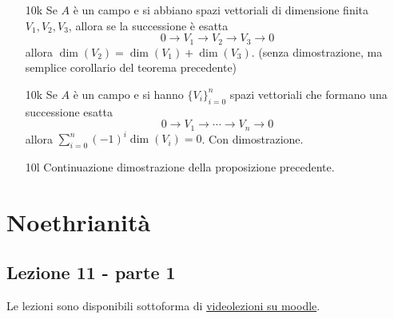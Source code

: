 \documentclass[italian]{article}
\begin{document}
\begin{enumerate}
      \item[10k] Se $A$ è un campo e si abbiano spazi vettoriali di dimensione
        finita $V_1, V_2, V_3$, allora se la successione è esatta 
        \begin{equation*}
          0 \to V_1 \to  V_2 \to V_3 \to 0
        \end{equation*}
        allora $\dim(V_2) = \dim(V_1) + \dim(V_3)$. (senza dimostrazione, ma
        semplice corollario del teorema precedente)
      \item[10k] Se $A$ è un campo e si hanno $\{V_i\}_{i = 0}^n$ 
     	spazi vettoriali che formano una successione esatta 
        \begin{equation*}
          0 \to V_1 \to \cdots \to V_n \to 0
        \end{equation*}
        allora $\sum_{i = 0}^n (-1)^i \dim(V_i) = 0$. Con dimostrazione. 
      \item[10l] Continuazione dimostrazione della proposizione precedente.
    \end{enumerate}   
    
    \section{Noethrianità}
    
    \subsection{Lezione 11 - parte 1}

	Le lezioni sono disponibili sottoforma di 
	\href{https://didatticaonline.unitn.it/dol/course/view.php?id=23268}{videolezioni
		su moodle}.
	
\end{document}
